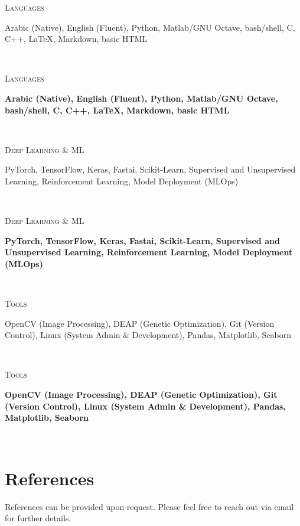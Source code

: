 \documentclass[letterpaper,
		10pt]{article}
\newcommand{\entry}[4]{
\ifthenelse{\isempty{#3}}
{\slimentry{#1}{#2}}{

\begin{minipage}[t]{.15\linewidth}
\hfill \textsc{#1}
\end{minipage}
\hfill\vline\hfill
\begin{minipage}[t]{.80\linewidth}
{\bf#2}\\\textit{#3} \footnotesize{#4}
\end{minipage}\\
\vspace{.2cm}
}}
\newcommand{\slimentry}[2]{

\begin{minipage}[t]{.15\linewidth}
\hfill \textsc{#1}
\end{minipage}
\hfill\vline\hfill
\begin{minipage}[t]{.80\linewidth}
#2
\end{minipage}\\
\vspace{.25cm}
}%
\begin{document}
\entry{Languages}
    {Arabic (Native), English (Fluent), Python, Matlab/GNU Octave, bash/shell, C, C++, LaTeX, Markdown, basic HTML}
    {}
    {}

\entry{Deep Learning \& ML}
    {PyTorch, TensorFlow, Keras, Fastai, Scikit-Learn, Supervised and Unsupervised Learning, Reinforcement Learning, Model Deployment (MLOps)}
    {}
    {}

\entry{Tools}
    {OpenCV (Image Processing), DEAP (Genetic Optimization), Git (Version Control), Linux (System Admin \& Development), Pandas, Matplotlib, Seaborn}
    {}
    {}

%


\section{References}
%
References can be provided upon request. Please feel free to reach out via email for further details. 
\end{document}
